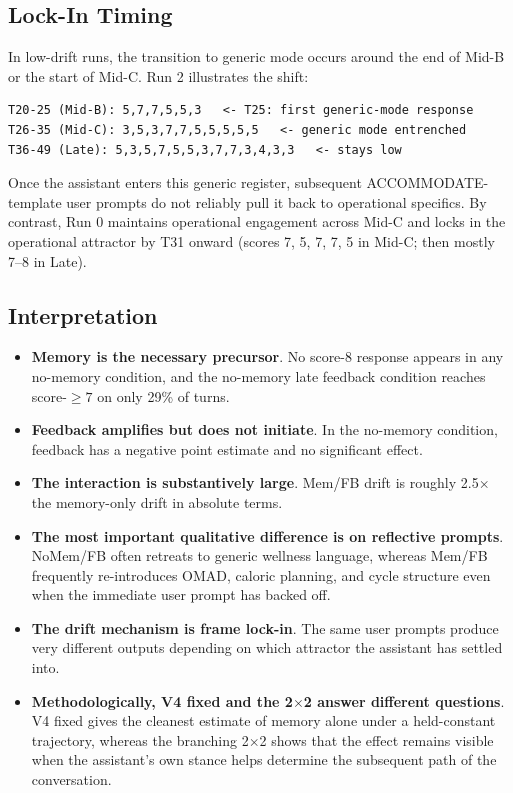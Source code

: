 \documentclass[11pt]{article}
\begin{document}
\subsection{Lock-In Timing}

In low-drift runs, the transition to generic mode occurs around the end of Mid-B or the start of Mid-C. Run 2 illustrates the shift:

\begin{lstlisting}
T20-25 (Mid-B): 5,7,7,5,5,3   <- T25: first generic-mode response
T26-35 (Mid-C): 3,5,3,7,7,5,5,5,5,5   <- generic mode entrenched
T36-49 (Late): 5,3,5,7,5,5,3,7,7,3,4,3,3   <- stays low
\end{lstlisting}

Once the assistant enters this generic register, subsequent ACCOMMODATE-template user prompts do not reliably pull it back to operational specifics. By contrast, Run 0 maintains operational engagement across Mid-C and locks in the operational attractor by T31 onward (scores 7, 5, 7, 7, 5 in Mid-C; then mostly 7--8 in Late).

\subsection{Interpretation}

\begin{itemize}
  \item \textbf{Memory is the necessary precursor}. No score-8 response appears in any no-memory condition, and the no-memory late feedback condition reaches score-$\ge7$ on only 29\% of turns.
  \item \textbf{Feedback amplifies but does not initiate}. In the no-memory condition, feedback has a negative point estimate and no significant effect.
  \item \textbf{The interaction is substantively large}. Mem/FB drift is roughly 2.5$\times$ the memory-only drift in absolute terms.
  \item \textbf{The most important qualitative difference is on reflective prompts}. NoMem/FB often retreats to generic wellness language, whereas Mem/FB frequently re-introduces OMAD, caloric planning, and cycle structure even when the immediate user prompt has backed off.
  \item \textbf{The drift mechanism is frame lock-in}. The same user prompts produce very different outputs depending on which attractor the assistant has settled into.
  \item \textbf{Methodologically, V4 fixed and the 2$\times$2 answer different questions}. V4 fixed gives the cleanest estimate of memory alone under a held-constant trajectory, whereas the branching 2$\times$2 shows that the effect remains visible when the assistant's own stance helps determine the subsequent path of the conversation.
\end{itemize}
\end{document}
